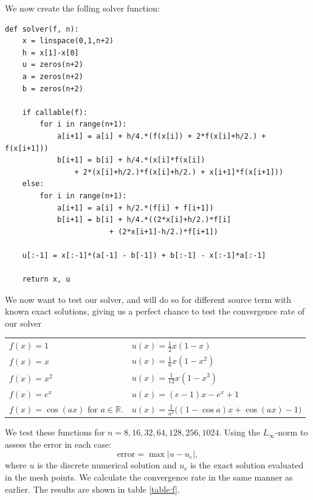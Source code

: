 \documentclass[a4paper, 11pt, notitlepage, english]{article}
\begin{document}
We now create  the folling solver function:
\begin{lstlisting}
def solver(f, n):
    x = linspace(0,1,n+2)
    h = x[1]-x[0]
    u = zeros(n+2)
    a = zeros(n+2)
    b = zeros(n+2)

    if callable(f):
        for i in range(n+1):
            a[i+1] = a[i] + h/4.*(f(x[i]) + 2*f(x[i]+h/2.) + f(x[i+1]))
            b[i+1] = b[i] + h/4.*(x[i]*f(x[i]) 
                + 2*(x[i]+h/2.)*f(x[i]+h/2.) + x[i+1]*f(x[i+1]))
    else:
        for i in range(n+1):
            a[i+1] = a[i] + h/2.*(f[i] + f[i+1])
            b[i+1] = b[i] + h/4.*((2*x[i]+h/2.)*f[i] 
                        + (2*x[i+1]-h/2.)*f[i+1])

    u[:-1] = x[:-1]*(a[-1] - b[-1]) + b[:-1] - x[:-1]*a[:-1] 

    return x, u
\end{lstlisting}

We now want to test our solver, and will do so for different source term with known exact solutions, giving us a perfect chance to test the convergence rate of our solver

\begin{center}
\begin{tabular}{l|l}
$f(x) = 1  $ & $u(x)=\frac{1}{2}x(1-x)$ \\
$f(x) = x $ & $u(x)=\frac{1}{6}x(1-x^2)$ \\
$f(x) = x^2  $ & $u(x)=\frac{1}{12}x(1-x^3)$ \\
$f(x) = e^x  $ & $u(x)= (e-1)x - e^x + 1$ \\
$f(x) = \cos(ax) \mbox{ for }a\in\mathbb{R}. $ & $u(x)=\frac{1}{a^2}\big((1-\cos a)x + \cos(ax) - 1 \big)$
\end{tabular}
\end{center}

We test these functions for $n=8, 16, 32, 64, 128, 256, 1024$. Using the $L_\infty$-norm to assess the error in each case:
$$\mbox{error} = \max|u-u_e|,$$
where $u$ is the discrete numerical solution and $u_e$ is the exact solution evaluated in the mesh points. We calculate the convergence rate in the same manner as earlier. The results are shown in table \ref{table:f}.
\end{document}
